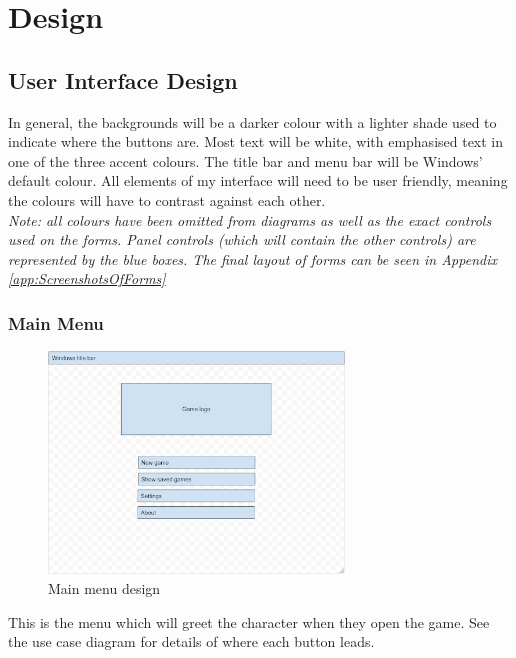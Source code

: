 \chapter{Design}
\section{User Interface Design}
In general, the backgrounds will be a darker colour with a lighter shade used to indicate where the buttons are. Most text will be white, with emphasised text in one of the three accent colours.
The title bar and menu bar will be Windows' default colour.
All elements of my interface will need to be user friendly, meaning the colours will have to contrast against each other.\\
\textit{Note: all colours have been omitted from diagrams as well as the exact controls used on the forms. Panel controls (which will contain the other controls) are represented by the blue boxes. The final layout of forms can be seen in Appendix \ref{app:ScreenshotsOfForms}}
\subsection{Main Menu}
\begin{figure}[H]
    \centering
    \includegraphics[width=0.7\textwidth]{images/design/mainMenu.png}
    \caption{Main menu design}
    \label{fig:design-mainMenu}
\end{figure}
This is the menu which will greet the character when they open the game. See the use case diagram for details of where each button leads.

